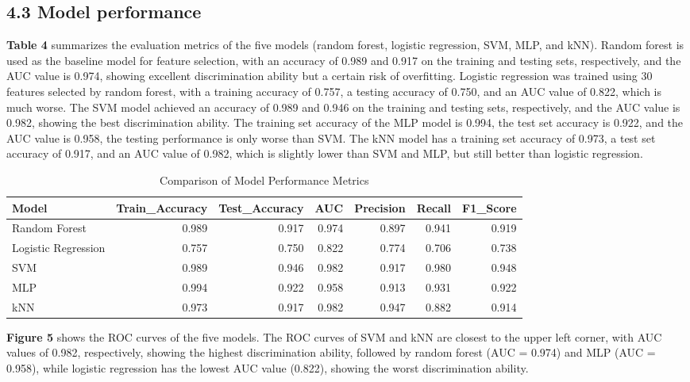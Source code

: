 \documentclass[
  doc]{apa6}
\begin{document}
\newpage

\subsection{4.3 Model performance}\label{model-performance}

\textbf{Table 4} summarizes the evaluation metrics of the five models (random forest, logistic regression, SVM, MLP, and kNN). Random forest is used as the baseline model for feature selection, with an accuracy of 0.989 and 0.917 on the training and testing sets, respectively, and the AUC value is 0.974, showing excellent discrimination ability but a certain risk of overfitting. Logistic regression was trained using 30 features selected by random forest, with a training accuracy of 0.757, a testing accuracy of 0.750, and an AUC value of 0.822, which is much worse. The SVM model achieved an accuracy of 0.989 and 0.946 on the training and testing sets, respectively, and the AUC value is 0.982, showing the best discrimination ability. The training set accuracy of the MLP model is 0.994, the test set accuracy is 0.922, and the AUC value is 0.958, the testing performance is only worse than SVM. The kNN model has a training set accuracy of 0.973, a test set accuracy of 0.917, and an AUC value of 0.982, which is slightly lower than SVM and MLP, but still better than logistic regression.

\begin{table}[!h]
\centering
\caption{\label{tab:unnamed-chunk-6}Comparison of Model Performance Metrics}
\centering
\begin{tabular}[t]{l|r|r|r|r|r|r}
\hline
Model & Train\_Accuracy & Test\_Accuracy & AUC & Precision & Recall & F1\_Score\\
\hline
Random Forest & 0.989 & 0.917 & 0.974 & 0.897 & 0.941 & 0.919\\
\hline
Logistic Regression & 0.757 & 0.750 & 0.822 & 0.774 & 0.706 & 0.738\\
\hline
SVM & 0.989 & 0.946 & 0.982 & 0.917 & 0.980 & 0.948\\
\hline
MLP & 0.994 & 0.922 & 0.958 & 0.913 & 0.931 & 0.922\\
\hline
kNN & 0.973 & 0.917 & 0.982 & 0.947 & 0.882 & 0.914\\
\hline
\end{tabular}
\end{table}

\textbf{Figure 5} shows the ROC curves of the five models. The ROC curves of SVM and kNN are closest to the upper left corner, with AUC values of 0.982, respectively, showing the highest discrimination ability, followed by random forest (AUC = 0.974) and MLP (AUC = 0.958), while logistic regression has the lowest AUC value (0.822), showing the worst discrimination ability.
\end{document}
